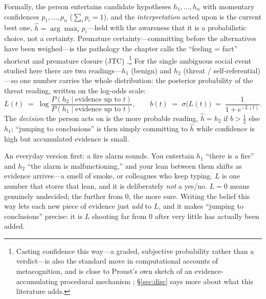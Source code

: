 \documentclass[11pt]{article}
\newcommand{\sig}{\sigma}
\begin{document}
\noindent Formally, the person entertains candidate hypotheses $h_1,\dots,h_n$ with momentary confidences $p_1,\dots,p_n$ ($\sum_i p_i=1$), and the \emph{interpretation} acted upon is the current best one, $\hat h=\arg\max_i p_i$---held with the awareness that it is a probabilistic choice, not a certainty. Premature certainty---committing before the alternatives have been weighed---is the pathology the chapter calls the ``feeling = fact'' shortcut and premature closure (JTC) \citep[p.~5]{HanEtAL2025}.\footnote{Casting confidence this way---a graded, subjective probability rather than a verdict---is also the standard move in computational accounts of metacognition, and is close to Proust's own sketch of an evidence-accumulating procedural mechanism \citep{FlemingDaw2017,Proust2012}; \S\ref{sec:disc} says more about what this literature adds.} For the single ambiguous social event studied here there are two readings---$h_1$ (benign) and $h_2$ (threat / self-referential)---so one number carries the whole distribution: the posterior probability of the threat reading, written on the log-odds scale:
\begin{equation}
L(t) \;=\; \log\frac{P(h_2\mid \text{evidence up to }t)}{P(h_1\mid \text{evidence up to }t)},
\qquad
b(t)\;=\;\sig\!\big(L(t)\big)\;=\;\frac{1}{1+e^{-L(t)}} .
\label{eq:belief}
\end{equation}
The \emph{decision} the person acts on is the more probable reading, $\hat h = h_2$ if $b>\tfrac12$ else $h_1$; ``jumping to conclusions'' is then simply committing to $\hat h$ while confidence is high but accumulated evidence is small.

\begin{plainbox}
An everyday version first: a fire alarm sounds. You entertain $h_1$ ``there is a fire'' and $h_2$ ``the alarm is malfunctioning,'' and your lean between them shifts as evidence arrives---a smell of smoke, or colleagues who keep typing. $L$ is one number that stores that lean, and it is deliberately \emph{not} a yes/no. $L=0$ means genuinely undecided; the further from $0$, the more sure. Writing the belief this way lets each new piece of evidence just \emph{add} to $L$, and it makes ``jumping to conclusions'' precise: it is $L$ shooting far from $0$ after very little has actually been added.
\end{plainbox}
\end{document}

